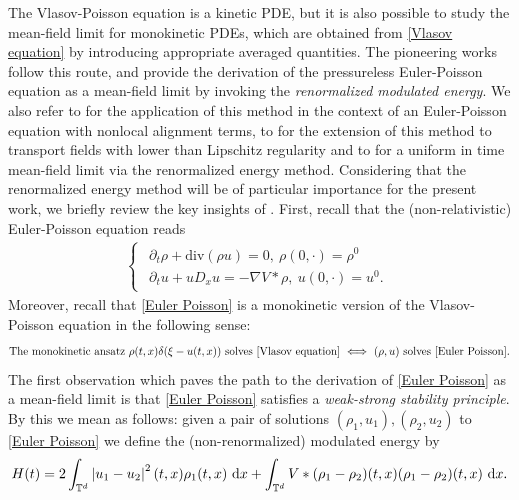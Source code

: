 \documentclass[11pt,reqno]{amsart}
\numberwithin{equation}{section}
\def\dd{{\rm d}}
\begin{document}
The Vlasov-Poisson equation is a kinetic PDE, but it is also possible to study the mean-field limit for monokinetic PDEs, which are obtained from \eqref{Vlasov equation} by introducing appropriate averaged quantities. The pioneering works \cite{duerinckx2020mean,bresch2020modulated} follow this route, and provide the derivation of the pressureless Euler-Poisson equation as a mean-field limit by invoking the \textit{renormalized modulated energy}. We also refer to \cite{carrillo2021mean} for the application of this method in the context of an Euler-Poisson equation with  nonlocal alignment terms, to \cite{rosenzweig2022mean, HessChildsRosenzweigSerfaty2026} for the extension of this method to transport fields with lower than Lipschitz regularity and to \cite{de2023sharp} for a uniform in time mean-field limit via the renormalized energy method.  Considering that the renormalized energy method  will be of particular importance for the present work, we briefly review the key insights of \cite{duerinckx2020mean}. First, recall that the (non-relativistic) Euler-Poisson equation reads 
\begin{align} 
\begin{cases}
\begin{array}{lc}
\partial_{t}\rho+\mathrm{div}(\rho u)=0, \ \rho(0,\cdot)=\rho^{0}\\\partial_{t}u+uD_{x}u=-\nabla V\ast \rho , \ u(0,\cdot)=u^{0}.  
\end{array} 
\end{cases}
\label{Euler Poisson}
\end{align}
Moreover, recall that \eqref{Euler Poisson} is a monokinetic version of the Vlasov-Poisson equation in the following sense: 
\begin{align*}
 \mbox{The monokinetic ansatz $\rho(t,x)\delta(\xi-u(t,x))$ solves \eqref{Vlasov equation} $\iff$ $(\rho,u)$ solves \eqref{Euler Poisson}}. \end{align*}
The first observation which paves the path to the derivation of \eqref{Euler Poisson} as a mean-field limit is that \eqref{Euler Poisson} satisfies a \textit{weak-strong stability principle}. By this we mean as follows: given a pair of solutions $(\rho_{1},u_{1}),(\rho_{2},u_{2})$ to \eqref{Euler Poisson} we define the (non-renormalized) modulated energy by  
\begin{align}
H(t)=2\int_{\mathbb{T}^{d}}\left\vert u_{1}-u_{2}\right\vert^{2}(t,x)\rho_{1}(t,x)\ \dd x+\int_{\mathbb{T}^{d}}V\ast (\rho_{1}-\rho_{2})(t,x)(\rho_{1}-\rho_{2})(t,x)\ \dd x. \label{nonrel Modulated energy}      
\end{align}
\end{document}
